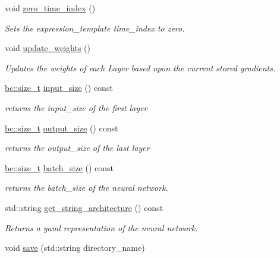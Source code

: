 \begin{DoxyCompactItemize}
void \hyperlink{structbc_1_1nn_1_1NeuralNetwork_aead05a9cd78bf9f495c0bcd6ea723bd6}{zero\+\_\+time\+\_\+index} ()
\begin{DoxyCompactList}\small\item\em Sets the expression\+\_\+template time\+\_\+index to zero. \end{DoxyCompactList}\item 
void \hyperlink{structbc_1_1nn_1_1NeuralNetwork_a28d1d6cf01f8bf959987cb9bdcd2bf79}{update\+\_\+weights} ()
\begin{DoxyCompactList}\small\item\em Updates the weights of each Layer based upon the current stored gradients. \end{DoxyCompactList}\item 
\hyperlink{namespacebc_aaf8e3fbf99b04b1b57c4f80c6f55d3c5}{bc\+::size\+\_\+t} \hyperlink{structbc_1_1nn_1_1NeuralNetwork_aaefe5c1d79e9ba9ecae822c50bb8e31d}{input\+\_\+size} () const
\begin{DoxyCompactList}\small\item\em returns the input\+\_\+size of the first layer \end{DoxyCompactList}\item 
\hyperlink{namespacebc_aaf8e3fbf99b04b1b57c4f80c6f55d3c5}{bc\+::size\+\_\+t} \hyperlink{structbc_1_1nn_1_1NeuralNetwork_a3721f03999058b98349a68d4e1a697db}{output\+\_\+size} () const
\begin{DoxyCompactList}\small\item\em returns the output\+\_\+size of the last layer \end{DoxyCompactList}\item 
\hyperlink{namespacebc_aaf8e3fbf99b04b1b57c4f80c6f55d3c5}{bc\+::size\+\_\+t} \hyperlink{structbc_1_1nn_1_1NeuralNetwork_a94b394fdf99d41f16ce04585f939927f}{batch\+\_\+size} () const
\begin{DoxyCompactList}\small\item\em returns the batch\+\_\+size of the neural network. \end{DoxyCompactList}\item 
std\+::string \hyperlink{structbc_1_1nn_1_1NeuralNetwork_ae5382a83cc99a5e0ff5e8107b7cca8c3}{get\+\_\+string\+\_\+architecture} () const
\begin{DoxyCompactList}\small\item\em Returns a yaml representation of the neural network. \end{DoxyCompactList}\item 
void \hyperlink{structbc_1_1nn_1_1NeuralNetwork_a533a431c81ec66797f2349d52d316aa3}{save} (std\+::string directory\+\_\+name)

\end{DoxyCompactItemize}
